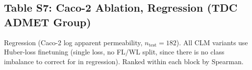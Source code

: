\documentclass[9pt,a4paper]{article}
\begin{document}
\newpage

\subsection*{Table S7: Caco-2 Ablation, Regression (TDC ADMET Group)}

Regression (Caco-2 log apparent permeability, $n_\text{test}=182$). All CLM variants
use Huber-loss finetuning (single loss, no FL/WL split, since there is no class
imbalance to correct for in regression). Ranked within each block by Spearman.
\end{document}

